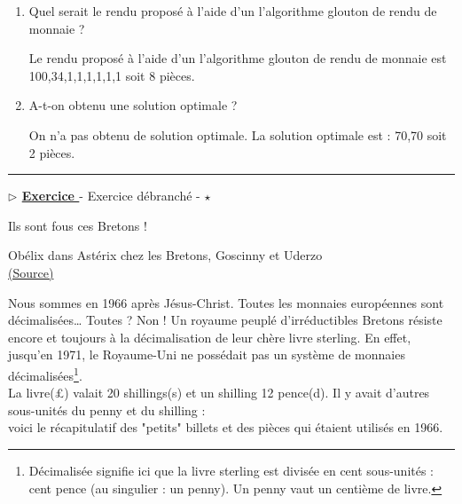 \documentclass[12pt,french]{article}
\newcounter{npb}
\newcommand{\exo}{
    \stepcounter{npb}
    {\textbf{$\triangleright$ \underline{Exercice \arabic{npb} }}}
}
\begin{document}
\begin{enumerate}
	\item Quel serait le rendu proposé à l'aide d'un l'algorithme glouton de rendu de monnaie ? 	
\begin{tcolorbox}[enhanced,attach boxed title to top center={yshift=-3mm,yshifttext=-1mm},
	colback=blue!5!white,colframe=blue!75!black,colbacktitle=blue!25!black,
	title=solution :, fonttitle=\bfseries,
	boxed title style={size=small,colframe=green!25!black} ]
	 Le rendu proposé à l'aide d'un l'algorithme glouton de rendu de monnaie est 100,34,1,1,1,1,1,1 soit 8 pièces.
	\end{tcolorbox} 

	\item A-t-on obtenu une solution optimale ? 

	\begin{tcolorbox}[enhanced,attach boxed title to top center={yshift=-3mm,yshifttext=-1mm},
		colback=blue!5!white,colframe=blue!75!black,colbacktitle=blue!25!black,
		title=solution :, fonttitle=\bfseries,
		boxed title style={size=small,colframe=green!25!black} ]
 On n'a pas obtenu de solution optimale. La solution optimale est : 70,70 soit 2 pièces.
\end{tcolorbox} 
\end{enumerate}
\hrule
\medskip
\exo - Exercice débranché - $\star$ 
\begin{center}
\og Ils sont fous ces Bretons ! \fg
\end{center}
\begin{flushright}
Obélix dans Astérix chez les Bretons, Goscinny et Uderzo\\
\href{https://omnilogie.fr/O/Livre,\_shilling,\_penny...\_le\_syst\%C3\%A8me\_mon\%C3\%A9taire\_anglais\_avant\_la\_d\%C3\%A9cimalisation}{(Source)}
\end{flushright}
Nous sommes en 1966 après Jésus-Christ. Toutes les monnaies européennes sont décimalisées… Toutes ? Non ! Un royaume peuplé d'irréductibles Bretons résiste encore et toujours à la décimalisation de leur chère livre sterling. En effet, jusqu'en 1971, le Royaume-Uni ne possédait pas un système de monnaies décimalisées\footnote{Décimalisée signifie ici que la livre sterling est divisée en cent sous-unités : cent pence (au singulier : un penny). Un penny vaut un centième de livre.}. \\
La livre(\pounds) valait 20 shillings(s) et un shilling 12 pence(d). Il y avait d'autres sous-unités du penny et du shilling :\\
voici le récapitulatif des "petits" billets et des pièces qui étaient utilisés en 1966.
\end{document}
